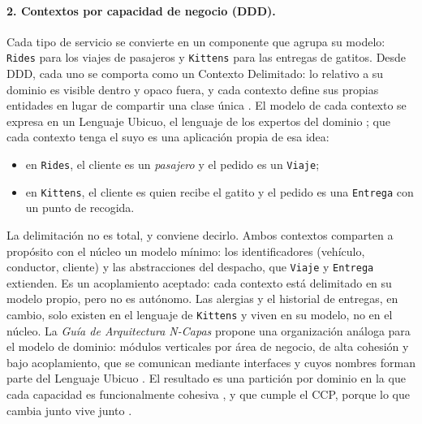 \paragraph{2. Contextos por capacidad de negocio (DDD).}
Cada tipo de servicio se convierte en un componente que agrupa su modelo: \texttt{Rides}
para los viajes de pasajeros y \texttt{Kittens} para las entregas de gatitos. Desde DDD,
cada uno se comporta como un Contexto Delimitado: lo relativo a su dominio es visible
dentro y opaco fuera, y cada contexto define sus propias entidades en lugar de compartir
una clase única \parencite[cap.~7]{richardsford2020}. El modelo de cada contexto se
expresa en un Lenguaje Ubicuo, el lenguaje de los expertos del dominio
\parencite[21]{delatorre2010}; que cada contexto tenga el suyo es una aplicación propia
de esa idea:
\begin{itemize}
  \item en \texttt{Rides}, el cliente es un \emph{pasajero} y el pedido es un
        \texttt{Viaje};
  \item en \texttt{Kittens}, el cliente es quien recibe el gatito y el pedido es una
        \texttt{Entrega} con un punto de recogida.
\end{itemize}
La delimitación no es total, y conviene decirlo. Ambos contextos comparten a propósito
con el núcleo un modelo mínimo: los identificadores (vehículo, conductor, cliente) y las
abstracciones del despacho, que \texttt{Viaje} y \texttt{Entrega} extienden. Es un
acoplamiento aceptado: cada contexto está delimitado en su modelo propio, pero no es
autónomo. Las alergias y el historial de entregas, en cambio, solo existen en el lenguaje
de \texttt{Kittens} y viven en su modelo, no en el núcleo. La \emph{Guía de Arquitectura
N-Capas} propone una organización análoga para el modelo de dominio: módulos verticales
por área de negocio, de alta cohesión y bajo acoplamiento, que se comunican mediante
interfaces y cuyos nombres forman parte del Lenguaje Ubicuo
\parencite[71--72]{delatorre2010}. El resultado es una partición por dominio en la que
cada capacidad es funcionalmente cohesiva \parencite[caps.~8 y 17]{richardsford2020}, y
que cumple el CCP, porque lo que cambia junto vive junto \parencite[105]{martin2017}.

